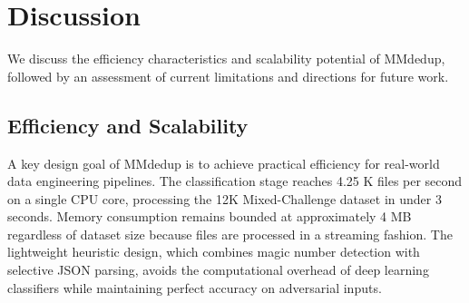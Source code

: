 \documentclass[conference]{IEEEtran}
\renewcommand{\arraystretch}{1.15}
\begin{document}
\begin{table}[t]
\caption{Auxiliary COCO Caption transfer for image-text cleaning splits.}
\label{tab:stage4_coco}
\centering
\scriptsize
\setlength{\tabcolsep}{3pt}
\renewcommand{\arraystretch}{1.10}
\end{table}


\vspace{-2mm}
\section{Discussion}
\label{sec:discussion}

We discuss the efficiency characteristics and scalability potential of MMdedup, followed by an assessment of current limitations and directions for future work.

\vspace{-2mm}
\subsection{Efficiency and Scalability}


A key design goal of MMdedup is to achieve practical efficiency for real-world data engineering pipelines. The classification stage reaches 4.25 K files per second on a single CPU core, processing the 12K Mixed-Challenge dataset in under 3 seconds. Memory consumption remains bounded at approximately 4 MB regardless of dataset size because files are processed in a streaming fashion. The lightweight heuristic design, which combines magic number detection with selective JSON parsing, avoids the computational overhead of deep learning classifiers while maintaining perfect accuracy on adversarial inputs.
\end{document}
